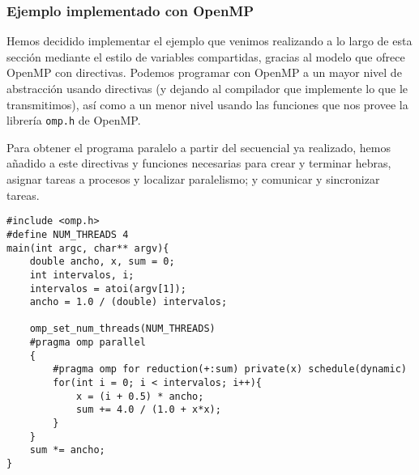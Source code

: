 \subsubsection{Ejemplo implementado con OpenMP}
Hemos decidido implementar el ejemplo que venimos realizando a lo largo de esta sección mediante el estilo de variables compartidas, gracias al modelo que ofrece OpenMP con directivas. Podemos programar con OpenMP a un mayor nivel de abstracción usando directivas (y dejando al compilador que implemente lo que le transmitimos), así como a un menor nivel usando las funciones que nos provee la librería \verb|omp.h| de OpenMP. 

Para obtener el programa paralelo a partir del secuencial ya realizado, hemos añadido a este directivas y funciones necesarias para crear y terminar hebras, asignar tareas a procesos y localizar paralelismo; y comunicar y sincronizar tareas.
\begin{verbatim}
#include <omp.h>
#define NUM_THREADS 4
main(int argc, char** argv){
    double ancho, x, sum = 0;
    int intervalos, i;
    intervalos = atoi(argv[1]);
    ancho = 1.0 / (double) intervalos;

    omp_set_num_threads(NUM_THREADS)
    #pragma omp parallel
    {
        #pragma omp for reduction(+:sum) private(x) schedule(dynamic)
        for(int i = 0; i < intervalos; i++){
            x = (i + 0.5) * ancho;
            sum += 4.0 / (1.0 + x*x);
        }
    }
    sum *= ancho;
}
\end{verbatim}


